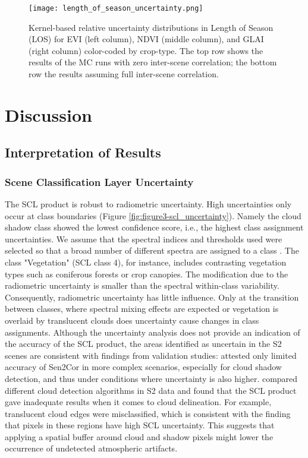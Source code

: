 \begin{figure*}
    \centering
    \texttt{[image: length\_of\_season\_uncertainty.png]}
    \caption{Kernel-based relative uncertainty distributions in Length of Season (LOS) for \gls{EVI} (left column), \gls{NDVI} (middle column), and \gls{GLAI} (right column) color-coded by crop-type. The top row shows the results of the  \gls{MC} runs with zero inter-scene correlation; the bottom row the results assuming full inter-scene correlation.}
    \label{fig:los-uncertainty}
\end{figure*}

\section{Discussion}
\label{sec:unc_discussion}

\subsection{Interpretation of Results}
\subsubsection{Scene Classification Layer Uncertainty}

The \gls{SCL} product is robust to radiometric uncertainty. High uncertainties only occur at class boundaries (Figure \ref{fig:figure3-scl_uncertainty}). Namely the cloud shadow class showed the lowest confidence score, i.e., the highest class assignment uncertainties. We assume that the spectral indices and thresholds used were selected so that a broad number of different spectra are assigned to a class \citep{muller-wilm_sentinel-2_2013}. The class "Vegetation" (SCL class 4), for instance, includes contrasting vegetation types such as coniferous forests or crop canopies. The modification due to the radiometric uncertainty is smaller than the spectral within-class variability. Consequently, radiometric uncertainty has little influence. Only at the transition between classes, where spectral mixing effects are expected or vegetation is overlaid by translucent clouds does uncertainty cause changes in class assignments. Although the uncertainty analysis does not provide an indication of the accuracy of the \gls{SCL} product, the areas identified as uncertain in the \gls{S2} scenes are consistent with findings from validation studies: \cite{louis_sentinel-2_2019} attested only limited accuracy of Sen2Cor in more complex scenarios, especially for cloud shadow detection, and thus under conditions where uncertainty is also higher. \cite{liu_clouds_2019} compared different cloud detection algorithms in \gls{S2} data and found that the \gls{SCL} product gave inadequate results when it comes to cloud delineation. For example, translucent cloud edges were misclassified, which is consistent with the finding that pixels in these regions have high \gls{SCL} uncertainty. This suggests that applying a spatial buffer around cloud and shadow pixels might lower the occurrence of undetected atmospheric artifacts.

